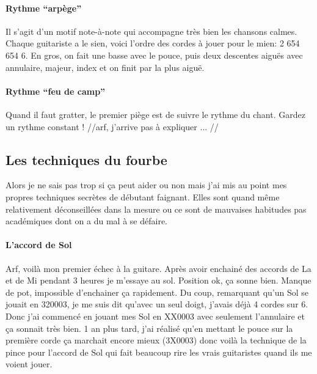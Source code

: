 \documentclass[a4paper]{article}
\begin{document}
\paragraph{Rythme ``arpège''} Il s'agit d'un motif note-à-note qui
accompagne très bien les chansons calmes. Chaque guitariste a le
sien, voici l'ordre des cordes à jouer pour le mien: 2 654 654 6. En
gros, on fait une basse avec le pouce, puis deux descentes aiguës avec
annulaire, majeur, index et on finit par la plus aiguë.

\paragraph{Rythme ``feu de camp''} Quand il faut gratter, le premier
piège est de suivre le rythme du chant. Gardez un rythme constant !
//arf, j'arrive pas à expliquer ... //


\subsection{Les techniques du fourbe}

Alors je ne sais pas trop si ça peut aider ou non mais j'ai mis au
point mes propres techniques secrètes de débutant faignant. Elles sont
quand même relativement déconseillées dans la mesure ou ce sont de
mauvaises habitudes pas académiques dont on a du mal à se défaire.

\paragraph{L'accord de Sol}
Arf, voilà mon premier échec à la guitare. Après avoir enchainé des
accords de La et de Mi pendant 3 heures je m'essaye au sol. Position
ok, ça sonne bien. Manque de pot, impossible d'enchainer ça
rapidement.  Du coup, remarquant qu'un Sol se jouait en 320003, je me
suis dit qu'avec un seul doigt, j'avais déjà 4 cordes sur 6. Donc j'ai
commencé en jouant mes Sol en XX0003 avec seulement l'annulaire et ça
sonnait très bien. 1 an plus tard, j'ai réalisé qu'en mettant le pouce
sur la première corde ça marchait encore mieux (3X0003) donc voilà la
technique de la pince pour l'accord de Sol qui fait beaucoup rire les
vrais guitaristes quand ils me voient jouer.
\end{document}
